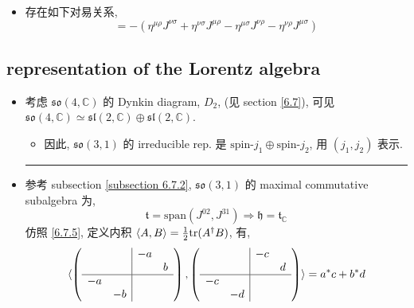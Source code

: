 \begin{itemize}
\begin{itemize}
		\item 存在如下对易关系,
		\begin{equation}
			[J^{\mu \nu}, J^{\rho \sigma}] = - (\eta^{\mu \rho} J^{\nu \sigma} + \eta^{\nu \sigma} J^{\mu \rho} - \eta^{\mu \sigma} J^{\nu \rho} - \eta^{\nu \rho} J^{\mu \sigma})
		\end{equation}
	\end{itemize}
\end{itemize}

\subsection{representation of the Lorentz algebra}
\begin{itemize}
	\item 考虑 $\mathfrak{so}(4, \mathbb{C})$ 的 Dynkin diagram, $D_2$, (见 section \ref{6.7}), 可见 $\mathfrak{so}(4, \mathbb{C}) \simeq \mathfrak{sl}(2, \mathbb{C}) \oplus \mathfrak{sl}(2, \mathbb{C})$.
	\begin{itemize}
		\item 因此, $\mathfrak{so}(3, 1)$ 的 irreducible rep. 是 $\text{spin-} j_1 \oplus \text{spin-} j_2$, 用 $(j_1, j_2)$ 表示.
	\end{itemize}
	
	\noindent\rule[0.5ex]{\linewidth}{0.5pt} %
	
	\item 参考 subsection \ref{subsection 6.7.2}, $\mathfrak{so}(3, 1)$ 的 maximal commutative subalgebra 为,
	\begin{equation}
		\mathfrak{t} = \mathrm{span}(J^{0 2}, J^{3 1}) \Longrightarrow \mathfrak{h} = \mathfrak{t}_\mathbb{C}
	\end{equation}
	仿照 \eqref{6.7.5}, 定义内积 $\braket{A, B} = \frac{1}{2} \mathrm{tr}(A^\dag B)$, 有,
	\begin{equation}
		\braket{\left( \begin{array}{cc|cc}
				& & - a & \\
				& & & b \\
				\hline
				- a & & & \\
				& - b & &
			\end{array} \right), \left( \begin{array}{cc|cc}
				& & - c & \\
				& & & d \\
				\hline
				- c & & & \\
				& - d & &
			\end{array} \right)
		} = a^* c + b^* d
	\end{equation}
	

\end{itemize}
